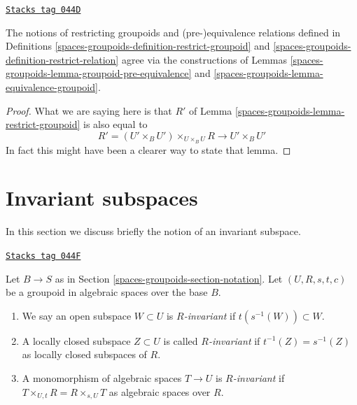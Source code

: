 \begin{lemma}
\label{spaces-groupoids-lemma-restrict-groupoid-relation}
\href{https://stacks.math.columbia.edu/tag/044D}{\texttt{Stacks tag 044D}}

The notions of restricting groupoids and
(pre-)equivalence relations defined in Definitions
\ref{spaces-groupoids-definition-restrict-groupoid} and \ref{spaces-groupoids-definition-restrict-relation}
agree via the constructions of
Lemmas \ref{spaces-groupoids-lemma-groupoid-pre-equivalence} and
\ref{spaces-groupoids-lemma-equivalence-groupoid}.
\end{lemma}

\begin{proof}
What we are saying here is that $R'$ of
Lemma \ref{spaces-groupoids-lemma-restrict-groupoid} is also
equal to
$$
R' = (U' \times_B U')\times_{U \times_B U} R
\longrightarrow
U' \times_B U'
$$
In fact this might have been a clearer way to state that lemma.
\end{proof}

\section{Invariant subspaces}
\label{spaces-groupoids-section-invariant}
In this section we discuss briefly the notion of an invariant subspace.

\begin{definition}
\label{spaces-groupoids-definition-invariant-open}
\href{https://stacks.math.columbia.edu/tag/044F}{\texttt{Stacks tag 044F}}

Let $B \to S$ as in Section \ref{spaces-groupoids-section-notation}.
Let $(U, R, s, t, c)$ be a groupoid in algebraic spaces over the base $B$.
\begin{enumerate}
\item We say an open subspace $W \subset U$ is {\it $R$-invariant} if
$t(s^{-1}(W)) \subset W$.
\item A locally closed subspace $Z \subset U$ is called {\it $R$-invariant}
if $t^{-1}(Z) = s^{-1}(Z)$ as locally closed subspaces of $R$.
\item A monomorphism of algebraic spaces $T \to U$ is {\it $R$-invariant}
if $T \times_{U, t} R = R \times_{s, U} T$ as algebraic spaces over $R$.
\end{enumerate}
\end{definition}

